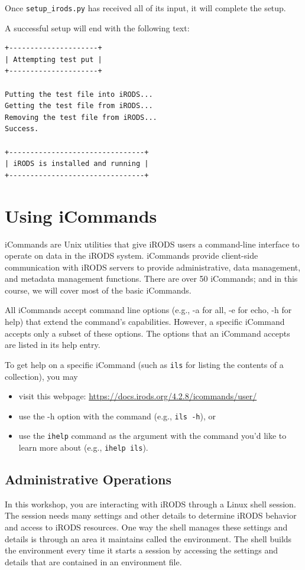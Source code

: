 \documentclass[10pt,oneside]{memoir}
\begin{document}
Once \texttt{setup\_irods.py} has received all of its input, it will complete the setup.

A successful setup will end with the following text:

\begin{lstlisting}
+---------------------+
| Attempting test put |
+---------------------+

Putting the test file into iRODS...
Getting the test file from iRODS...
Removing the test file from iRODS...
Success.

+--------------------------------+
| iRODS is installed and running |
+--------------------------------+
\end{lstlisting}

\chapter{Using iCommands}

iCommands are Unix utilities that give iRODS users a command-line interface to operate on data in the iRODS system. iCommands provide client-side communication with iRODS servers to provide administrative, data management, and metadata management functions. There are over 50 iCommands; and in this course, we will cover most of the basic iCommands.

All iCommands accept command line options (e.g., -a for all, -e for echo, -h for help) that extend the command's capabilities. However, a specific iCommand accepts only a subset of these options. The options that an iCommand accepts are listed in its help entry.

To get help on a specific iCommand (such as \texttt{ils} for listing the contents of a collection), you may
\begin{itemize}
 \item visit this webpage: \url{https://docs.irods.org/4.2.8/icommands/user/}
 \item use the -h option with the command (e.g., \texttt{ils -h}), or
 \item use the \texttt{ihelp} command as the argument with the command you'd like to learn more
         about (e.g., \texttt{ihelp ils}).
\end{itemize}

\section{Administrative Operations}
In this workshop, you are interacting with iRODS through a Linux shell session. The session needs many settings and other details to determine iRODS behavior and access to iRODS resources. One way the shell manages these settings and details is through an area it maintains called the environment. The shell builds the environment every time it starts a session by accessing the settings and details that are contained in an environment file.
\end{document}
